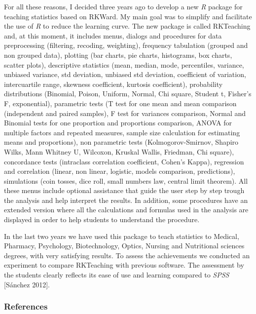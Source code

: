 \documentclass[11pt, a4paper]{article}
\newcommand{\pkg}[1]{{\normalfont\fontseries{b}\selectfont #1}}
\let\proglang=\textit
\begin{document}
For all these reasons, I decided three years ago to develop a new \proglang{R} package for teaching statistics based on
\pkg{RKWard}.
My main goal was to simplify and facilitate the use of \proglang{R} to reduce the learning curve.
The new package is called \pkg{RKTeaching} and, at this moment, it includes menus, dialogs and procedures for data
preprocessing (filtering, recoding, weighting), frequency tabulation (grouped and non grouped data), plotting (bar
charts, pie charts, histograms, box charts, scatter plots), descriptive statistics (mean, median, mode, percentiles,
variance, unbiased variance, std deviation, unbiased std deviation, coefficient of variation, intercuartile range,
skewness coefficient, kurtosis coefficient), probability distributions (Binomial, Poison, Uniform, Normal, Chi square,
Student t, Fisher's F, exponential), parametric tests (T test for one mean and mean comparison (independent and paired
samples), F test for variances comparison, Normal and Binomial tests for one proportion and proportions comparison,
ANOVA for multiple factors and repeated measures, sample size calculation for estimating means and proportions), non
parametric tests (Kolmogorov-Smirnov, Shapiro Wilks, Mann Whitney U, Wilcoxon, Kruskal Wallis, Friedman, Chi square),
concordance tests (intraclass correlation coefficient, Cohen's Kappa), regression and correlation (linear, non linear,
logistic, models comparison, predictions), simulations (coin tosses, dice roll, small numbers law, central limit
theorem).
All these menus include optional assistance that guide the user step by step trough the analysis and help interpret the
results. In addition, some procedures have an extended version where all the calculations and formulas used in the
analysis are displayed in order to help students  to understand the procedure.

In the last two years we have used this package to teach statistics to Medical, Pharmacy, Psychology, Biotechnology,
Optics, Nursing and Nutritional sciences degrees, with very satisfying results. To assess the achievements we conducted
an experiment to compare \pkg{RKTeaching} with previous software. The assessment by the students clearly reflects its ease of
use and learning compared to \proglang{SPSS} [S\'anchez 2012].




\subsubsection*{References}
\end{document}

